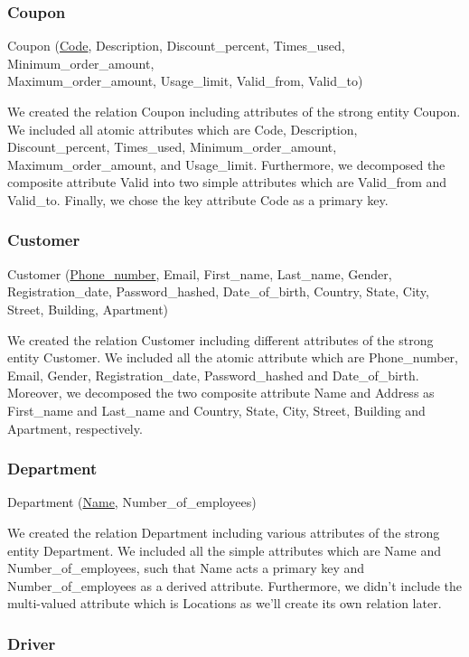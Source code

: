 \subsubsection{Coupon}

Coupon (\underline{Code}, Description, Discount\_percent, Times\_used, Minimum\_order\_amount,\\
Maximum\_order\_amount, Usage\_limit, Valid\_from, Valid\_to)

We created the relation Coupon including attributes of the strong entity Coupon. We included all atomic attributes which are Code, Description, Discount\_percent, Times\_used, Minimum\_order\_amount, Maximum\_order\_amount, and Usage\_limit. Furthermore, we decomposed the composite attribute Valid into two simple attributes which are Valid\_from and Valid\_to. Finally, we chose the key attribute Code as a primary key.

\subsubsection{Customer}

Customer (\underline{Phone\_number}, Email, First\_name, Last\_name, Gender, Registration\_date, Password\_hashed, Date\_of\_birth, Country, State, City, Street, Building, Apartment)

We created the relation Customer including different attributes of the strong entity Customer. We included all the atomic attribute which are Phone\_number, Email, Gender, Registration\_date, Password\_hashed and Date\_of\_birth. Moreover, we decomposed the two composite attribute Name and Address as First\_name and Last\_name and Country, State, City, Street, Building and Apartment, respectively.

\subsubsection{Department}

Department (\underline{Name}, Number\_of\_employees)

We created the relation Department including various attributes of the strong entity Department. We included all the simple attributes which are Name and Number\_of\_employees, such that Name acts a primary key and Number\_of\_employees as a derived attribute. Furthermore, we didn't include the multi-valued attribute which is Locations as we'll create its own relation later.


\subsubsection{Driver}


